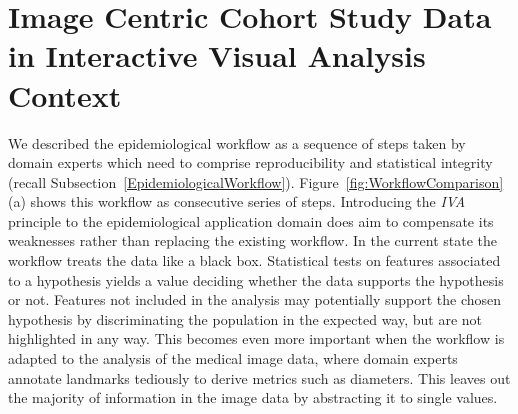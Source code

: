 \documentclass[journal]{style/vgtc} 			          %
\begin{document}
\section{Image Centric Cohort Study Data in Interactive Visual Analysis Context} \label{Image Centric Cohort Study Data in Interactive Visual Analysis Context}
%
We described the epidemiological workflow as a sequence of steps taken by domain experts which need to comprise reproducibility and statistical integrity (recall Subsection~\ref{EpidemiologicalWorkflow}).
%
Figure~\ref{fig:WorkflowComparison} (a) shows this workflow as consecutive series of steps.
%
Introducing the \emph{IVA} principle to the epidemiological application domain does aim to compensate its weaknesses rather than replacing the existing workflow.
%
In the current state the workflow treats the data like a black box.
%
Statistical tests on features associated to a hypothesis yields a value deciding whether the data supports the hypothesis or not.
%
%
Features not included in the analysis may potentially support the chosen hypothesis by discriminating the population in the expected way, but are not highlighted in any way.
%
This becomes even more important when the workflow is adapted to the analysis of the medical image data, where
domain experts annotate landmarks tediously to derive metrics such as diameters. %
%
This leaves out the majority of information in the image data by abstracting it to single values.
%
\end{document}
